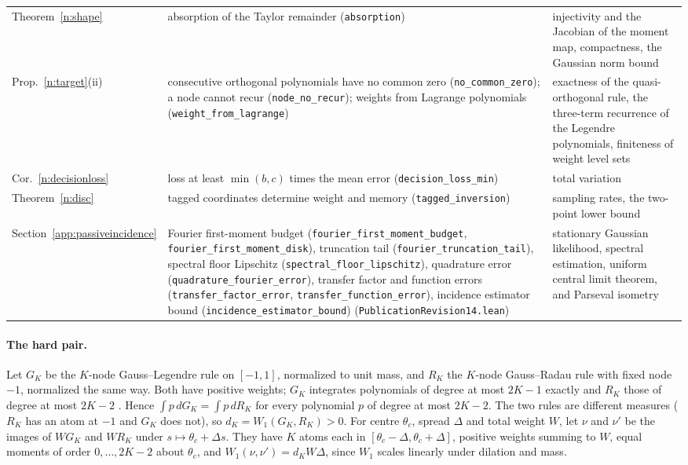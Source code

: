 \documentclass[12pt]{article}
\theoremstyle{definition}
\theoremstyle{remark}
\begin{document}
{\begin{longtable}{>{\raggedright\arraybackslash}p{}>{\raggedright\arraybackslash}p{}>{\raggedright\arraybackslash}p{}}
Theorem~\ref{n:shape} & absorption of the Taylor remainder (\nolinkurl{absorption}) & injectivity and the Jacobian of the moment map, compactness, the Gaussian norm bound\\
Prop.~\ref{n:target}(ii) & consecutive orthogonal polynomials have no common zero (\nolinkurl{no_common_zero}); a node cannot recur (\nolinkurl{node_no_recur}); weights from Lagrange polynomials (\nolinkurl{weight_from_lagrange}) & exactness of the quasi-orthogonal rule, the three-term recurrence of the Legendre polynomials, finiteness of weight level sets\\
Cor.~\ref{n:decisionloss} & loss at least $\min(b,c)$ times the mean error (\nolinkurl{decision_loss_min}) & total variation\\
Theorem~\ref{n:disc} & tagged coordinates determine weight and memory (\nolinkurl{tagged_inversion}) & sampling rates, the two-point lower bound\\
Section~\ref{app:passiveincidence} & Fourier first-moment budget (\texttt{fourier\_first\_moment\_budget}, \texttt{fourier\_first\_moment\_disk}), truncation tail (\texttt{fourier\_truncation\_tail}), spectral floor Lipschitz (\texttt{spectral\_floor\_lipschitz}), quadrature error (\texttt{quadrature\_fourier\_error}), transfer factor and function errors (\texttt{transfer\_factor\_error}, \texttt{transfer\_function\_error}), incidence estimator bound (\texttt{incidence\_estimator\_bound}) (\nolinkurl{PublicationRevision14.lean}) & stationary Gaussian likelihood, spectral estimation, uniform central limit theorem, and Parseval isometry\\
\bottomrule
\end{longtable}}

\paragraph{The hard pair.} Let $G_K$ be the $K$-node Gauss--Legendre rule on $[-1,1]$, normalized to unit mass, and $R_K$ the $K$-node Gauss--Radau rule with fixed node $-1$, normalized the same way. Both have positive weights; $G_K$ integrates polynomials of degree at most $2K-1$ exactly and $R_K$ those of degree at most $2K-2$ \citep[Section~3.4]{szego1975}. Hence $\int p\,dG_K=\int p\,dR_K$ for every polynomial $p$ of degree at most $2K-2$. The two rules are different measures ($R_K$ has an atom at $-1$ and $G_K$ does not), so $d_K=W_1(G_K,R_K)>0$. For centre $\theta_c$, spread $\Delta$ and total weight $W$, let $\nu$ and $\nu'$ be the images of $WG_K$ and $WR_K$ under $s\mapsto\theta_c+\Delta s$. They have $K$ atoms each in $[\theta_c-\Delta,\theta_c+\Delta]$, positive weights summing to $W$, equal moments of order $0,\ldots,2K-2$ about $\theta_c$, and $W_1(\nu,\nu')=d_KW\Delta$, since $W_1$ scales linearly under dilation and mass.
\end{document}
